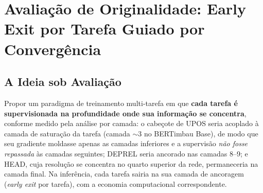 %

\section{Avaliação de Originalidade: Early Exit por Tarefa Guiado por Convergência}
\label{sec:proposta_saturation_routed}

\subsection{A Ideia sob Avaliação}
\label{subsec:proposta_ideia}

Propor um paradigma de treinamento multi-tarefa em que \textbf{cada tarefa é supervisionada na
profundidade onde sua informação se concentra}, conforme medido pela análise por camada: o
cabeçote de UPOS seria acoplado à camada de saturação da tarefa (camada $\sim$3 no BERTimbau
Base), de modo que seu gradiente moldasse apenas as camadas inferiores e a supervisão
\emph{não fosse repassada} às camadas seguintes; DEPREL seria ancorado nas camadas 8--9; e
HEAD, cuja resolução se concentra no quarto superior da rede, permaneceria na camada final.
Na inferência, cada tarefa sairia na sua camada de ancoragem (\textit{early exit} por tarefa),
com a economia computacional correspondente.

